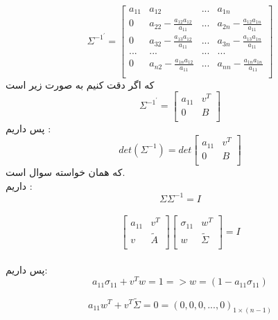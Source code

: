 \[
    {\Sigma^{-1^{\prime}}} = \begin{bmatrix}
    a_{11} & a_{12} & ... & a_{1n} \\
    0      & a_{22} -  \frac{a_{12}a_{12}}{a_{11}}& ... & a_{2n} - \frac{a_{12}a_{1n}}{a_{11}}\\
    0      & a_{32} - \frac{a_{13}a_{12}}{a_{11}} & ... & a_{3n} - \frac{a_{13}a_{1n}}{a_{11}}\\
    ... & ... & ... & ... \\
    0      & a_{n2}- \frac{a_{1n}a_{12}}{a_{11}} & ... & a_{nn}- \frac{a_{1n}a_{1n}}{a_{11}} \\
\end{bmatrix}
\]
که اگر دقت کنیم به صورت زیر است
\[ 
    {\Sigma^{-1^{\prime}}} = \begin{bmatrix}
        a_{11} & v^{T} \\
        0 & B \\
    \end{bmatrix}
\]
پس داریم :\\
\[ det(\Sigma^{-1}) = det \begin{bmatrix}
    a_{11} & v^{T} \\
    0 & B \\
\end{bmatrix}
\]
که همان خواسته سوال است.\\












\parte{}
داریم :\\
\[
    \Sigma \Sigma^{-1} = I
\]\\
\[
    \begin{bmatrix}
        a_{11} & v^{T} \\
        v & \tilde{A} \\
    \end{bmatrix}
    \begin{bmatrix}
        \sigma_{11} & w^{T} \\
        w & \tilde{\Sigma} \\
    \end{bmatrix}
    =I
\]\\
پس داریم:\\
\[
    a_{11}\sigma_{11}+v^T w = 1
    => w = (1 - a_{11}\sigma_{11})
\]

\[
    a_{11}w^T+v^T \tilde{\Sigma} = 0 = (0,0,0,...,0)_{1\times(n-1)}
\]

